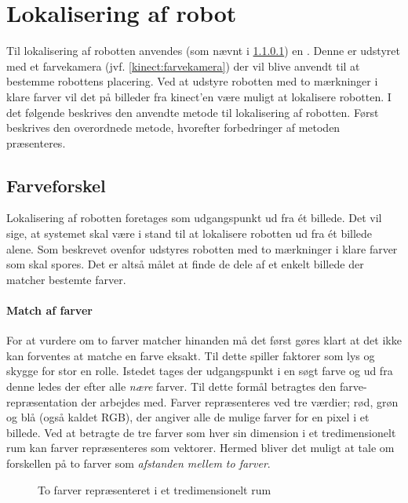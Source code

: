 \section{Lokalisering af robot}
Til lokalisering af robotten anvendes (som nævnt i \cref{}) en \kinect.
Denne er udstyret med et farvekamera (jvf. \cref{kinect:farvekamera}) der vil blive anvendt til at bestemme robottens placering.
Ved at udstyre robotten med to mærkninger i klare farver vil det på billeder fra kinect'en være muligt at lokalisere robotten.
I det følgende beskrives den anvendte metode til lokalisering af robotten.
Først beskrives den overordnede metode, hvorefter forbedringer af metoden præsenteres.

\subsection{Farveforskel}
Lokalisering af robotten foretages som udgangspunkt ud fra \'et billede.
Det vil sige, at systemet skal være i stand til at lokalisere robotten ud fra \'et billede alene.
Som beskrevet ovenfor udstyres robotten med to mærkninger i klare farver som skal spores.
Det er altså målet at finde de dele af et enkelt billede der matcher bestemte farver.

\paragraph{Match af farver}
For at vurdere om to farver matcher hinanden må det først gøres klart at det ikke kan forventes at matche en farve eksakt.
Til dette spiller faktorer som lys og skygge for stor en rolle.
Istedet tages der udgangspunkt i en søgt farve og ud fra denne ledes der efter alle \textit{nære} farver.
Til dette formål betragtes den farve-repræsentation der arbejdes med.
Farver repræsenteres ved tre værdier; rød, grøn og blå (også kaldet RGB), der angiver alle de mulige farver for en pixel i et billede.
Ved at betragte de tre farver som hver sin dimension i et tredimensionelt rum kan farver repræsenteres som vektorer.
Hermed bliver det muligt at tale om forskellen på to farver som \textit{afstanden mellem to farver}.

\begin{figure}
\centering

\caption{To farver repræsenteret i et tredimensionelt rum}
\label{tracking:colorspace}
\end{figure}

